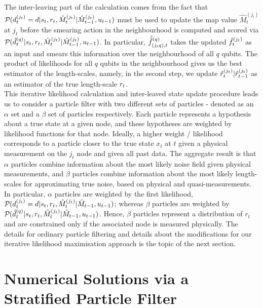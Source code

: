 \\
The inter-leaving part of the calculation comes from the fact that $ \mathcal{P}_{} ( d^{( j_t )}_{t}=d | s_{ t}, r_{ t}, \hat{M}_t^{(j_t)}| \hat{M}_{t-1}^{(j_t)}, u_{t-1} )$ must be used to update the map value $\hat{M}_t^{(j_t)}$ at $j_t$  before the smearing action in the neighbourhood is computed and scored via $\mathcal{P}_{} (  \hat{d}^{( q )}_{t}|s_{ t}, r_{ t}, \hat{M}_t^{(j_t)}| \hat{M}_{t-1}^{(j_t)}, u_{t-1 } )$. In particular, $ \hat{\hat{f}}^{(q)}_{(j_tq),t}$ takes the updated $\hat{f}^{( j_t )}_{t}$ as an input and smears this information over the neighbourhood of all $q$ qubits. The product of likelihoods for all $q$ qubits in the neighbourhood gives us the best estimator of the length-scales, namely, in the second step, we update $\hat{r}^{( j_t )}_{t} | \hat{r}^{( j_t )}_{t-1} $ as an estimator of the true length-scale $r_{ t}$. \\

This iterative likelihood calculation and inter-leaved state update procedure leads us to consider a particle filter with two different sets of particles - denoted as an $\alpha$ set and a $\beta$ set of particles respectively. Each particle represents a hypothesis about a true state at a given node, and these hypotheses are weighted by likelihood functions for that node. Ideally, a higher weight / likelihood corresponds to a particle closer to the true state $x_t$ at $t$ given a physical measurement on the $j_t$ node and given all past data.  The aggregate result is that $\alpha$ particles combine information about the most likely noise field given physical measurements, and $\beta$ particles combine information about the most likely length-scales for approximating true noise, based on physical and quasi-measurements. In particular, $\alpha$ particles are weighted by the first likelihood, $\mathcal{P}_{} ( d^{( j_t )}_{t}=d | s_{ t}, r_{ t}, \hat{M}_t^{(j_t)}| \hat{M}_{t-1}, u_{t-1} )$; whereas $\beta$ particles are weighted by $\mathcal{P}_{} (  \hat{d}^{( q )}_{t}|s_{ t}, r_{ t}, \hat{M}_t^{(j_t)}| \hat{M}_{t-1}, u_{t-1 } )$. Hence, $\beta$ particles represent a distribution of $r_t$ and are constrained only if the associated node is measured physically. The details for ordinary particle filtering and details about the modifications for our iterative likelihood maximisation approach is the topic of the next section.

\section{Numerical Solutions via a Stratified Particle Filter}

